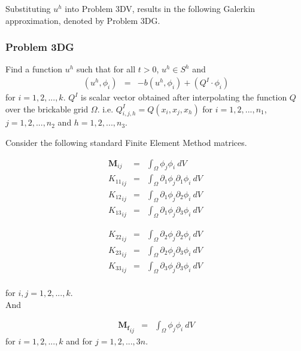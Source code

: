 	Substituting $u^h$ into Problem 3DV, results in the following Galerkin approximation, denoted by Problem 3DG.

	\subsubsection*{Problem 3DG}
	Find a function $u^h$ such that for all $t>0$, $u^h \in S^h$ and
	\begin{eqnarray*}
		(u^h, \phi_i) & = & -b(u^h,\phi_i) + (Q^I \cdot \phi_i)
	\end{eqnarray*} for $i = 1,2,...,k$. $Q^I$ is scalar vector obtained after interpolating the function $Q$ over the brickable grid $\Omega$. i.e. $Q^I_{i,j, h} = Q(x_i,x_j, x_h)$ for $i = 1,2,...,n_1$, $j = 1,2,...,n_2$ and $h = 1,2,...,n_3$.

	Consider the following standard Finite Element Method matrices.

	\noindent\begin{minipage}{.5\linewidth}
		\begin{eqnarray*}
			\mathbf{M}_{ij} & = & \int_{\Omega} \phi_j \phi_i \ dV \ \\
			{K_{11}}_{ij} & = & \int_{\Omega} \partial_1\phi_j \partial_1\phi_i \ dV \  \\
			{K_{12}}_{ij} & = & \int_{\Omega} \partial_1\phi_j \partial_2\phi_i \ dV \ \\
			{K_{13}}_{ij} & = & \int_{\Omega} \partial_1\phi_j \partial_3\phi_i \ dV \ 
		\end{eqnarray*}
	\end{minipage}%
	\begin{minipage}{.5\linewidth}
		\begin{eqnarray*}
			{K_{22}}_{ij} & = & \int_{\Omega} \partial_2\phi_j \partial_2\phi_i \ dV \  \\
			{K_{23}}_{ij} & = & \int_{\Omega} \partial_2\phi_j \partial_3\phi_i \ dV \ \\
			{K_{33}}_{ij} & = & \int_{\Omega} \partial_3\phi_j \partial_3\phi_i \ dV \ \\
		\end{eqnarray*}
	\end{minipage}
	for $i,j = 1,2,...,k.$\\

	And

	\begin{eqnarray*}
		\mathbf{M_f}_{ij} & = & \int_{\Omega} \phi_j \phi_i \ dV
	\end{eqnarray*}
	for $i = 1,2,...,k$ and for $j = 1,2,...,3n.$\\

